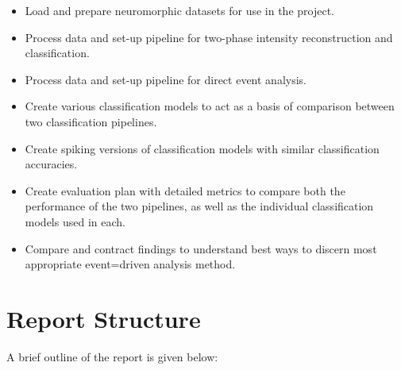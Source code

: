 \begin{itemize}
      \item Load and prepare neuromorphic datasets for use in the project.
      \item Process data and set-up pipeline for two-phase intensity reconstruction and classification.
      \item Process data and set-up pipeline for direct event analysis.
      \item Create various classification models to act as a basis of comparison between two classification pipelines.
      \item Create spiking versions of classification models with similar classification accuracies.
      \item Create evaluation plan with detailed metrics to compare both the performance of the two pipelines, as well as the individual classification models used in each.
      \item Compare and contract findings to understand best ways to discern most appropriate event=driven analysis method.
\end{itemize}

\section{Report Structure}

A brief outline of the report is given below:

